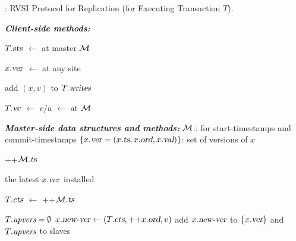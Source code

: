 \begin{algorithm}[H]
  \caption{\rvsims{}: RVSI Protocol for Replication (for Executing Transaction $T$).}
  \label{alg:rvsims}
  \begin{algorithmic}[1]
    \Statex \textbf{\textit{Client-side methods:}}
    \hStatex

    \State $T.\textsl{sts}$ $\gets$   at master 
    $\mathcal{M}$   \label{line:call-start}
    \EndProcedure

      \State $x.\textsl{ver}$ $\gets$   at any site
    \EndProcedure

      \State add $(x, v)$ to $T.\textsl{writes}$ \label{line:write-at-client}
    \EndProcedure

    \State $T.\textsl{vc}$ $\gets$  \label{line:call-add-vc}
    \State $c/a$ $\gets$   at $\mathcal{M}$ \label{line:call-commit}
    \EndProcedure

    \Statex \hrulefill

    \Statex \textbf{\textit{Master-side data structures and methods:}}
    \Statex $\mathcal{M}$.: for start-timestamps and commit-timestamps
    \Statex $\{x.\textsl{ver} = (x.\textsl{ts}, x.\textsl{ord}, x.\textsl{val})\}$: set of versions of $x$
    \hStatex

    \State \Return ++$\mathcal{M}.\textsl{ts}$
    \EndProcedure
    
      \State \Return the latest $x.\textsl{ver}$ installed \label{line:read-at-master}
    \EndProcedure

    \label{line:call-check-vc}
      \State $T.\textsl{cts}$ $\gets$ ++$\mathcal{M}.\textsl{ts}$ 

      \State $T.\textrm{\it upvers} = \emptyset$    
      \label{line:commit-updates}
      \State $x.\textsl{new-ver} \gets (T.\textsl{cts}, \textrm{++}x.\textsl{ord}, v)$
      \State add $x.\textsl{new-ver}$ to $\{x.\textsl{ver}\}$ and $T.\textrm{\it upvers}$
      \EndFor 
      \State {}  to slaves 
      \label{line:commit-prop}


\end{algorithmic}
\end{algorithm}
